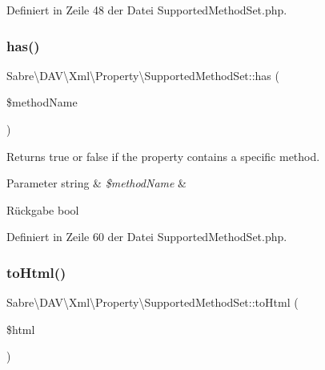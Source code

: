 Definiert in Zeile 48 der Datei Supported\+Method\+Set.\+php.

\mbox{\label{class_sabre_1_1_d_a_v_1_1_xml_1_1_property_1_1_supported_method_set_aa07d75f0a223532499f9ac41628565ed}} 
\subsubsection{\texorpdfstring{has()}{has()}}
{\footnotesize\ttfamily Sabre\textbackslash{}\+D\+A\+V\textbackslash{}\+Xml\textbackslash{}\+Property\textbackslash{}\+Supported\+Method\+Set\+::has (\begin{DoxyParamCaption}\item[{}]{\$method\+Name }\end{DoxyParamCaption})}

Returns true or false if the property contains a specific method.


\begin{DoxyParams}[1]{Parameter}
string & {\em \$method\+Name} & \\
\hline
\end{DoxyParams}
\begin{DoxyReturn}{Rückgabe}
bool 
\end{DoxyReturn}


Definiert in Zeile 60 der Datei Supported\+Method\+Set.\+php.

\mbox{\label{class_sabre_1_1_d_a_v_1_1_xml_1_1_property_1_1_supported_method_set_afcab0ef1e0a50669a6591f27ae0f75b3}} 
\subsubsection{\texorpdfstring{to\+Html()}{toHtml()}}
{\footnotesize\ttfamily Sabre\textbackslash{}\+D\+A\+V\textbackslash{}\+Xml\textbackslash{}\+Property\textbackslash{}\+Supported\+Method\+Set\+::to\+Html (\begin{DoxyParamCaption}\item[{\mbox{\hyperlink{class_sabre_1_1_d_a_v_1_1_browser_1_1_html_output_helper}{Html\+Output\+Helper}}}]{\$html }\end{DoxyParamCaption})}

